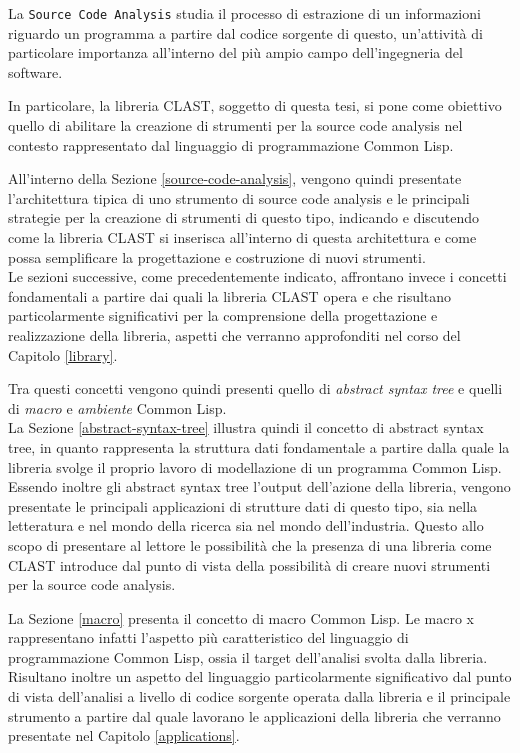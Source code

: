 \documentclass{book}
\begin{document}
La \texttt{Source Code Analysis} studia il processo di estrazione di un
informazioni riguardo un programma a partire dal codice sorgente di questo,
un’attività di particolare importanza all'interno del più ampio campo
dell'ingegneria del software.

In particolare, la libreria CLAST, soggetto di questa tesi, si pone come
obiettivo quello di abilitare la creazione di strumenti per la source code
analysis nel contesto rappresentato dal linguaggio di programmazione Common
Lisp.

All'interno della Sezione \ref{source-code-analysis}, vengono quindi presentate
l'architettura tipica di uno strumento di source code analysis e le principali
strategie per la creazione di strumenti di questo tipo, indicando e discutendo
come la libreria CLAST si inserisca all'interno di questa architettura e come
possa semplificare la progettazione e costruzione di nuovi strumenti.\\

Le sezioni successive, come precedentemente indicato, affrontano invece i
concetti fondamentali a partire dai quali la libreria CLAST opera e che
risultano particolarmente significativi per la comprensione della progettazione
e realizzazione della libreria, aspetti che verranno approfonditi nel corso del
Capitolo \ref{library}.

Tra questi concetti vengono quindi presenti quello di
\textit{abstract syntax tree} e quelli di \textit{macro} e \textit{ambiente}
Common Lisp.\\

La Sezione \ref{abstract-syntax-tree} illustra quindi il concetto di abstract
syntax tree, in quanto rappresenta la struttura dati fondamentale a partire
dalla quale la libreria svolge il proprio lavoro di modellazione di un programma
Common Lisp. Essendo inoltre gli abstract syntax tree l'output dell'azione della
libreria, vengono presentate le principali applicazioni di strutture dati di
questo tipo, sia nella letteratura e nel mondo della ricerca sia nel mondo
dell'industria. Questo allo scopo di presentare al lettore le possibilità che la
presenza di una libreria come CLAST introduce dal punto di vista della
possibilità di creare nuovi strumenti per la source code analysis.

La Sezione \ref{macro} presenta il concetto di macro Common Lisp. Le macro x
rappresentano infatti l'aspetto più caratteristico del linguaggio di
programmazione Common Lisp, ossia il target dell'analisi svolta dalla libreria.
Risultano inoltre un aspetto del linguaggio particolarmente significativo dal
punto di vista dell'analisi a livello di codice sorgente operata dalla libreria
e il principale strumento a partire dal quale lavorano le applicazioni della
libreria che verranno presentate nel Capitolo \ref{applications}.
\end{document}
